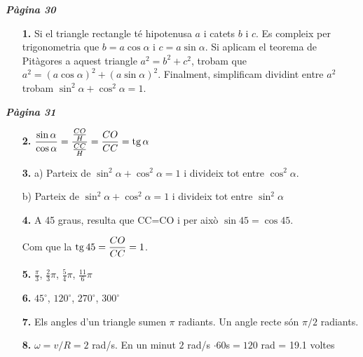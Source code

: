 \documentclass[a4paper, pdf, twoside]{book}
\begin{document}
\begin{multicols}{2}
{\textbf{\em Pàgina 30}} \hrulefill
\begin{enumerate}
\vspace{0.25cm}
\item[\fontfamily{phv}\selectfont\color{blue}\textbf{1. }] 
Si el triangle rectangle té hipotenusa $a$ i catets $b$ i $c$. Es compleix per trigonometria que $b=a\cos \alpha $ i $c=a\sin \alpha $. Si aplicam el teorema de Pitàgores a aquest triangle $a^2 = b^2 + c^2$, trobam que $a^2 = (a\cos \alpha )^2+ (a\sin \alpha )^2$. Finalment, simplificam dividint entre $a^2$ trobam $\sin ^2 \alpha + \cos ^2 \alpha = 1$.
 \end{enumerate}
\vspace{0.3cm}


{\textbf{\em Pàgina 31}} \hrulefill
\begin{enumerate}
\vspace{0.25cm}
\item[\fontfamily{phv}\selectfont\color{blue}\textbf{2. }] 
$\dfrac {\sin \alpha }{\cos \alpha }=\dfrac {\frac {CO}{H}}{\frac {CC}{H}}=\dfrac {CO}{CC}=\mathrm{tg}\, \alpha $
 \end{enumerate}
\begin{enumerate}
\vspace{0.25cm}
\item[\fontfamily{phv}\selectfont\color{blue}\textbf{3. }] 
a) Parteix de $\sin ^2 \alpha + \cos ^2 \alpha = 1$ i divideix tot entre $\cos ^2 \alpha $.\par b) Parteix de $\sin ^2 \alpha + \cos ^2 \alpha = 1$ i divideix tot entre $\sin ^2 \alpha $
\vspace{0.25cm}
\item[\fontfamily{phv}\selectfont\color{blue}\textbf{4. }] 
A 45 graus, resulta que CC=CO i per això $\sin 45 = \cos 45$.\par Com que la $\mathrm{tg}\, 45 = \dfrac {CO}{CC}=1$.
\vspace{0.25cm}
\item[\fontfamily{phv}\selectfont\color{blue}\textbf{5. }] 
$\frac {\pi }{3}$, $\frac {2}{3}\pi $, $\frac {5}{4}\pi $, $\frac {11}{6}\pi $
\vspace{0.25cm}
\item[\fontfamily{phv}\selectfont\color{blue}\textbf{6. }] 
$45^\circ $, $120^\circ $, $270^\circ $, $300^\circ $
\vspace{0.25cm}
\item[\fontfamily{phv}\selectfont\color{blue}\textbf{7. }] 
Els angles d'un triangle sumen $\pi $ radiants. Un angle recte són $\pi /2$ radiants.
\vspace{0.25cm}
\item[\fontfamily{phv}\selectfont\color{blue}\textbf{8. }] 
$\omega =v/R=2$ rad/s. En un minut \linebreak $2$ rad/s $\cdot 60 $s$ = 120 $ rad = 19.1 voltes
 \end{enumerate}
\vspace{0.3cm}


\end{multicols}
\end{document}
